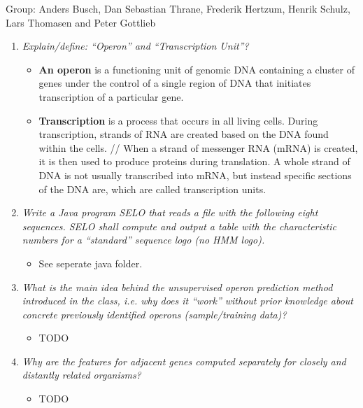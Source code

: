 \documentclass[a4paper,10pt,titlepage]{article}
\begin{document}
Group: Anders Busch, Dan Sebastian Thrane, Frederik Hertzum, Henrik Schulz, Lars Thomasen and Peter Gottlieb
\begin{enumerate}

\item
\textit{Explain/define: “Operon” and “Transcription Unit”?}\\

\begin{itemize}
\item
\textbf{An operon} is a functioning unit of genomic DNA containing a cluster of genes under the control of a single region of DNA that initiates transcription of a particular gene. 
\item
\textbf{Transcription} is a process that occurs in all living cells. During transcription, strands of RNA are created based on the DNA found within the cells. //
When a strand of messenger RNA (mRNA) is created, it is then used to produce proteins during translation. A whole strand of DNA is not usually transcribed into mRNA, but instead specific sections of the DNA are, which are called transcription units.
\end{itemize}

\item
\textit{Write a Java program SELO that reads a file with the following eight sequences. SELO shall compute and output a table with the
characteristic numbers for a “standard” sequence logo (no HMM logo).}\\

\begin{itemize}
\item
See seperate java folder.
\end{itemize}

\item
\textit{What is the main idea behind the unsupervised operon prediction method introduced in the class, i.e. why does it “work” without prior knowledge about concrete previously identified operons (sample/training data)?}\\

\begin{itemize}
\item
TODO
\end{itemize}

\item
\textit{Why are the features for adjacent genes computed separately for closely and distantly related organisms?}\\

\begin{itemize}
\item
TODO
\end{itemize}


\end{enumerate}
\end{document}
